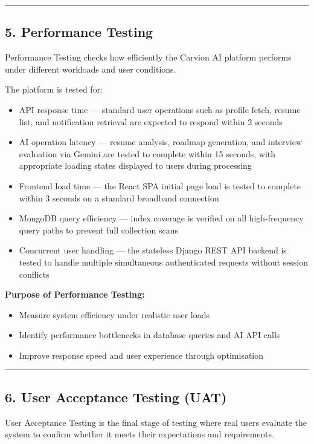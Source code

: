 \documentclass[12pt]{article}
\begin{document}
\noindent\rule{\textwidth}{0.4pt}

\subsection{5. Performance Testing}

Performance Testing checks how efficiently the Carvion AI platform performs under different workloads and user conditions.

The platform is tested for:

\begin{itemize}
  \item API response time — standard user operations such as profile fetch, resume list, and notification retrieval are expected to respond within 2 seconds
  \item AI operation latency — resume analysis, roadmap generation, and interview evaluation via Gemini are tested to complete within 15 seconds, with appropriate loading states displayed to users during processing
  \item Frontend load time — the React SPA initial page load is tested to complete within 3 seconds on a standard broadband connection
  \item MongoDB query efficiency — index coverage is verified on all high-frequency query paths to prevent full collection scans
  \item Concurrent user handling — the stateless Django REST API backend is tested to handle multiple simultaneous authenticated requests without session conflicts
\end{itemize}

\textbf{Purpose of Performance Testing:}

\begin{itemize}
  \item Measure system efficiency under realistic user loads
  \item Identify performance bottlenecks in database queries and AI API calls
  \item Improve response speed and user experience through optimisation
\end{itemize}

\noindent\rule{\textwidth}{0.4pt}

\subsection{6. User Acceptance Testing (UAT)}

User Acceptance Testing is the final stage of testing where real users evaluate the system to confirm whether it meets their expectations and requirements.
\end{document}
